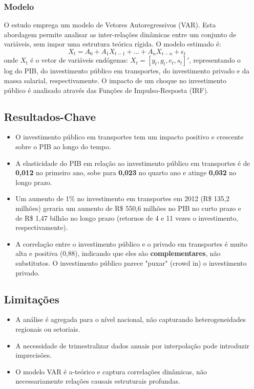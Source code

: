 \documentclass[12pt]{article}
\begin{document}
\subsubsection*{Modelo}
O estudo emprega um modelo de Vetores Autoregressivos (VAR). Esta abordagem permite analisar as inter-relações dinâmicas entre um conjunto de variáveis, sem impor uma estrutura teórica rígida. O modelo estimado é:
\begin{equation*}
    X_t = A_0 + A_1 X_{t-1} + \dots + A_n X_{t-n} + \epsilon_t
\end{equation*}
onde $X_t$ é o vetor de variáveis endógenas: $X_t = [y_t, g_t, e_t, s_t]'$, representando o log do PIB, do investimento público em transportes, do investimento privado e da massa salarial, respectivamente. O impacto de um choque no investimento público é analisado através das Funções de Impulso-Resposta (IRF).

\subsection*{Resultados-Chave}
\begin{itemize}
    \item O investimento público em transportes tem um impacto positivo e crescente sobre o PIB ao longo do tempo.
    \item A elasticidade do PIB em relação ao investimento público em transportes é de \textbf{0,012} no primeiro ano, sobe para \textbf{0,023} no quarto ano e atinge \textbf{0,032} no longo prazo.
    \item Um aumento de 1\% no investimento em transportes em 2012 (R\$ 135,2 milhões) geraria um aumento de R\$ 550,6 milhões no PIB no curto prazo e de R\$ 1,47 bilhão no longo prazo (retornos de 4 e 11 vezes o investimento, respectivamente).
    \item A correlação entre o investimento público e o privado em transportes é muito alta e positiva (0,88), indicando que eles são \textbf{complementares}, não substitutos. O investimento público parece "puxar" (crowd in) o investimento privado.
\end{itemize}

\subsection*{Limitações}
\begin{itemize}
    \item A análise é agregada para o nível nacional, não capturando heterogeneidades regionais ou setoriais.
    \item A necessidade de trimestralizar dados anuais por interpolação pode introduzir imprecisões.
    \item O modelo VAR é a-teórico e captura correlações dinâmicas, não necessariamente relações causais estruturais profundas.
\end{itemize}
\end{document}
